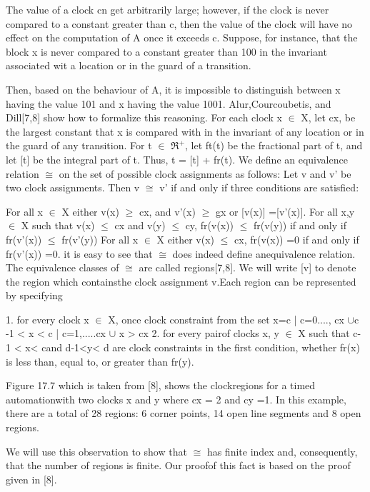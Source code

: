 The value of a clock cn get arbitrarily large; however, if the clock is never compared to a constant greater than c, then the value of the clock will have no effect on the computation of A once it exceeds c. Suppose, for instance, that the block x is never compared to a constant greater than 100 in the invariant associated wit a location or in the guard of a transition.

Then, based on the behaviour of A, it is impossible to distinguish between x having the value 101 and x having the value 1001.
Alur,Courcoubetis, and Dill[7,8] show how to formalize this reasoning. For each clock x $\in$ X, let cx, be the largest constant that x is compared with in the invariant of any location or in the guard of any transition. For t $\in$  $\Re^{+}$, let ft(t) be the fractional part of t, and let [t] be the integral part of t. Thus, t = [t] + fr(t). We define an equivalence relation $\cong$ on the set of possible clock assignments as follows: Let v and v' be two clock assignments.
Then v  $\cong$ v' if and only if three conditions are  satisfied: \\
\newline

For all x $\in$ X either v(x) $\geq$ cx, and v'(x) $\geq$ gx or [v(x)] =[v'(x)].
For all x,y $\in$ X such that v(x) $\leq$ cx and v(y) $\leq$ cy, fr(v(x)) $\leq$ fr(v(y)) if and only if fr(v'(x)) 
$\leq$ fr(v'(y))
For all x $\in$ X either v(x) $\leq$ cx,
fr(v(x)) =0 if and only if fr(v'(x)) =0.
it is easy to see that $\cong$ does indeed define anequivalence relation. The equivalence classes of $\cong$ are called regions[7,8].  We will write [v] to denote the region which containsthe clock assignment v.Each region can be represented by specifying \\
\newline

1. for every clock x $\in$ X, once clock constraint from the set {x=c | c=0...., cx} $\cup${c -1 < x < c | c=1,.....cx} $\cup$ {x > cx}
2. for every pairof clocks x, y $\in$ X such that c-1 < x< cand d-1<y< d are clock constraints in the first condition, whether fr(x) is less than, equal to, or greater than fr(y).

Figure 17.7 which is taken from [8], shows the clockregions for a timed automationwith two clocks x and y where cx = 2 and cy =1. In this example, there are a total of 28 regions: 6 corner points, 14 open line segments and 8 open regions.

We will use this observation to show that $\cong$ has finite index and, consequently, that the  number of regions is finite. Our proofof this fact is based on the proof given in [8].





